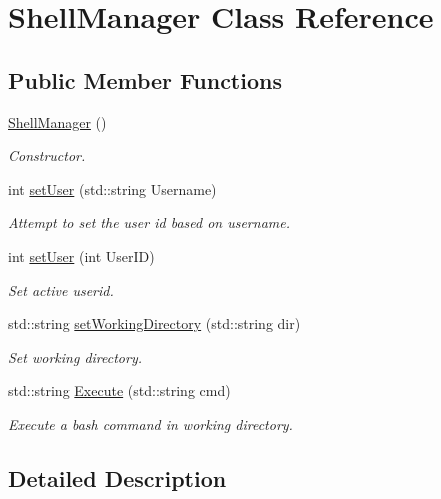 \hypertarget{classShellManager}{\section{Shell\-Manager Class Reference}
\label{classShellManager}
}
\subsection*{Public Member Functions}
\begin{DoxyCompactItemize}
\item 
\hyperlink{classShellManager_a04dec3699269bb388648f6017fd9fd15}{Shell\-Manager} ()
\begin{DoxyCompactList}\small\item\em Constructor. \end{DoxyCompactList}\item 
int \hyperlink{classShellManager_a9e595c79f89d7c796df213b469384e08}{set\-User} (std\-::string Username)
\begin{DoxyCompactList}\small\item\em Attempt to set the user id based on username. \end{DoxyCompactList}\item 
int \hyperlink{classShellManager_a0451c163858db5c51c8976d9bf7dd37d}{set\-User} (int User\-I\-D)
\begin{DoxyCompactList}\small\item\em Set active userid. \end{DoxyCompactList}\item 
std\-::string \hyperlink{classShellManager_aeed1b234a317e951f01bdc42a2097d40}{set\-Working\-Directory} (std\-::string dir)
\begin{DoxyCompactList}\small\item\em Set working directory. \end{DoxyCompactList}\item 
std\-::string \hyperlink{classShellManager_a9f40b1296bef8f0d694cafdca29e0e13}{Execute} (std\-::string cmd)
\begin{DoxyCompactList}\small\item\em Execute a bash command in working directory. \end{DoxyCompactList}\end{DoxyCompactItemize}


\subsection{Detailed Description}


